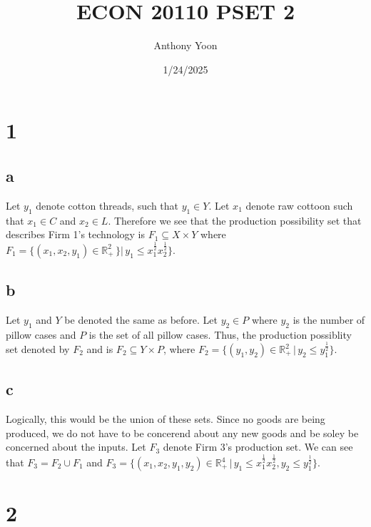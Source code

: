 \documentclass[11pt]{article}
\title{ECON 20110 PSET 2}
\author{Anthony Yoon}
\date{1/24/2025}
\newcommand{\R}{\mathbb{R}}
\begin{document}
\maketitle

\section*{1}
\subsection*{a}
Let $y_1$ denote cotton threads, such that $y_1 \in Y$. Let $x_1$ denote raw cottoon such that $x_1 \in C$ and $x_2 \in L$. Therefore we see that the production possibility set that describes Firm 1's technology is $F_1 \subseteq X \times Y$ where $F_1 = \{ (x_1, x_2, y_1) \in \R^2_+ \hspace{2pt} \}| \hspace{2pt} y_1 \leq x^{\frac{1}{2}}_1 x^{\frac{1}{2}}_2 \}$. 
\subsection*{b}
Let $y_1$ and $Y$ be denoted the same as before. Let $y_2 \in P$ where $y_2$ is the number of pillow cases and $P$ is the set of all pillow cases. Thus, the production possiblity set denoted by $F_2$ and is $F_2 \subseteq Y \times P$, where $F_2 = \{ (y_1, y_2) \in \R^2_+ \hspace{2pt} | \hspace{2pt} y_2 \leq y_1^{\frac{1}{2}}\}$. 
\subsection*{c}
Logically, this would be the union of these sets. Since no goods are being produced, we do not have to be concerend about any new goods and be soley be concerned about the inputs. Let $F_3$ denote Firm 3's production set. We can see that $F_3 = F_2 \cup F_1$ and $F_3 = \{(x_1, x_2, y_1, y_2) \in \R^4_+ \hspace{2pt} | \hspace{2pt} y_1 \leq x_1^{\frac{1}{2}} x_2^{\frac{1}{2}}, y_2 \leq y_1^{\frac{1}{2}}\}$.
\section*{2}
\end{document}
